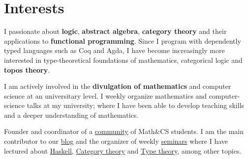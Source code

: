 \documentclass[nocolors]{friggeri-cv-a4}
\begin{document}
\section{Interests}

I passionate about \textbf{logic}, \textbf{abstract algebra}, \textbf{category theory} and their
applications to \textbf{functional programming}. Since I program with dependently
typed languages such as Coq and Agda, I have become increasingly more interested
in type-theoretical foundations of mathematics, categorical
logic and \textbf{topos theory}.

I am actively involved in the \textbf{divulgation of mathematics} and computer
science at an universitary level. I weekly organize mathematics and
computer-science talks at my university; where I have been able to
develop teaching skills and a deeper understanding of mathematics.

\begin{entrylist}
{ Founder and coordinator of a \href{http://libreim.github.io/}{community} of Math\&CS students.
  I am the main contributor to our \href{http://libreim.github.io/blog/}{blog} and
  the organizer of weekly \href{http://libreim.github.io/dgiim/awesome/seminars/}{seminars} where I have lectured about
  \href{https://github.com/libreim/haskell}{Haskell},
  \href{https://github.com/libreim/introCategorias/blob/master/categorias.pdf}{Category theory}
  and \href{https://github.com/libreim/curryHoward/blob/master/CurryHoward.pdf}{Type theory},
  among other topics.
}
\end{entrylist}
\end{document}
